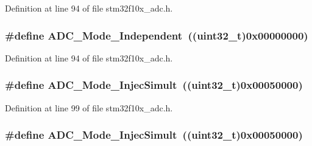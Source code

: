Definition at line 94 of file stm32f10x\+\_\+adc.\+h.

\subsubsection[{\texorpdfstring{A\+D\+C\+\_\+\+Mode\+\_\+\+Independent}{ADC_Mode_Independent}}]{\setlength{\rightskip}{0pt plus 5cm}\#define A\+D\+C\+\_\+\+Mode\+\_\+\+Independent~(({\bf uint32\+\_\+t})0x00000000)}\hypertarget{group___a_d_c__mode_ga2754d3a35559dc10e3d6a7d920e83432}{}\label{group___a_d_c__mode_ga2754d3a35559dc10e3d6a7d920e83432}


Definition at line 94 of file stm32f10x\+\_\+adc.\+h.

\subsubsection[{\texorpdfstring{A\+D\+C\+\_\+\+Mode\+\_\+\+Injec\+Simult}{ADC_Mode_InjecSimult}}]{\setlength{\rightskip}{0pt plus 5cm}\#define A\+D\+C\+\_\+\+Mode\+\_\+\+Injec\+Simult~(({\bf uint32\+\_\+t})0x00050000)}\hypertarget{group___a_d_c__mode_ga2339cc471aaf2db02daa4aeb49e9f0d9}{}\label{group___a_d_c__mode_ga2339cc471aaf2db02daa4aeb49e9f0d9}


Definition at line 99 of file stm32f10x\+\_\+adc.\+h.

\subsubsection[{\texorpdfstring{A\+D\+C\+\_\+\+Mode\+\_\+\+Injec\+Simult}{ADC_Mode_InjecSimult}}]{\setlength{\rightskip}{0pt plus 5cm}\#define A\+D\+C\+\_\+\+Mode\+\_\+\+Injec\+Simult~(({\bf uint32\+\_\+t})0x00050000)}\hypertarget{group___a_d_c__mode_ga2339cc471aaf2db02daa4aeb49e9f0d9}{}\label{group___a_d_c__mode_ga2339cc471aaf2db02daa4aeb49e9f0d9}


